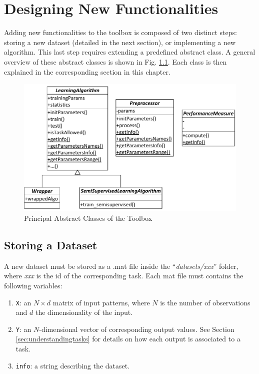 \chapter{Designing New Functionalities}
\label{chap:newfunctionalities}

Adding new functionalities to the toolbox is composed of two distinct steps: storing a new dataset (detailed in the next section), or implementing a new algorithm. This last step requires extending a predefined abstract class. A general overview of these abstract classes is shown in Fig. \ref{fig:classes}. Each class is then explained in the corresponding section in this chapter.

\begin{figure}
\centering
\includegraphics[scale=0.75]{./images/WrapperSchema}
\caption{Principal Abstract Classes of the Toolbox}
\label{fig:classes}
\end{figure}

\section{Storing a Dataset}
\label{sec:storingdataset}

A new dataset must be stored as a .mat file inside the ``\textit{datasets/xxx}'' folder, where \textit{xxx} is the id of the corresponding task. Each mat file must contains the following variables:

\begin{enumerate}
	\item \verb|X|: an $N \times d$ matrix of input patterns, where $N$ is the number of observations and $d$ the dimensionality of the input.
	\item \verb|Y|: an $N$-dimensional vector of corresponding output values. See Section \ref{sec:understandingtasks} for details on how each output is associated to a task.
	\item \verb|info|: a string describing the dataset.
\end{enumerate}

